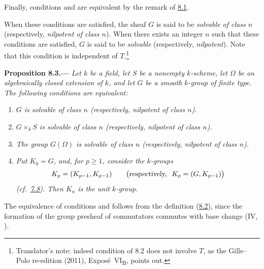 Finally, conditions \textup{} and \textup{} are
equivalent by the remark of \hyperref[par:sga3-VIB-8.1]{8.1}.

When these conditions are satisfied, the sheaf \(G\) is said
to be \emph{solvable of class \(n\)}
\textup{(}respectively, \emph{nilpotent of class \(n\)}\textup{)}.
When there exists an integer \(n\) such that these conditions are
satisfied, \(G\) is said to be \emph{solvable}
\textup{(}respectively, \emph{nilpotent}\textup{)}. Note that this
condition is independent of \(T\).\footnote{Translator's note: indeed condition
\textup{} of 8.2 does not involve \(T\), as the Gille--Polo re-edition (2011),
Exposé~VI\textsubscript{B}, points out.}

\medskip
{}\label{prop:sga3-VIB-8.3}%
\noindent\textbf{Proposition 8.3.---}
\emph{Let \(k\) be a field, let \(S\) be a nonempty
\(k\)-scheme, let \(\Omega\) be an algebraically closed
extension of \(k\), and let \(G\) be a smooth \(k\)-group of
finite type. The following conditions are equivalent:}
\begin{enumerate}
\item[\textup{\SGAInlineRefTarget{prop:sga3-VIB-8.3:item:i}(i)}]\label{concl:sga3-VIB-8.3-i}
  \emph{\(G\) is solvable of class \(n\)
  \textup{(respectively, nilpotent of class \(n\))}.}

\item[\textup{(ii)}]\label{concl:sga3-VIB-8.3-ii}
  \emph{\(G\times_kS\) is solvable of class \(n\)
  \textup{(respectively, nilpotent of class \(n\))}.}

\item[\textup{(iii)}]\label{concl:sga3-VIB-8.3-iii}
  \emph{The group \(G(\Omega)\) is solvable of class \(n\)
  \textup{(respectively, nilpotent of class \(n\))}.}

\item[\textup{(iv)}]\label{concl:sga3-VIB-8.3-iv}
  \emph{Put \(K_0=G\), and, for \(p\geq1\), consider the
  \(k\)-groups}
  \[
    K_p=(K_{p-1},K_{p-1})
    \qquad
    \bigl(\textup{respectively, }\ K_p=(G,K_{p-1})\bigr)
  \]
  \emph{\textup{(cf.\ \hyperref[prop:sga3-VIB-7.8]{7.8})}.
  Then \(K_n\) is the unit \(k\)-group.}
\end{enumerate}

The equivalence of conditions \textup{} and \textup{}
follows from the definition
\textup{(}\hyperref[prop:sga3-VIB-8.2]{8.2}\textup{)}, since the
formation of the group presheaf of commutators commutes with
base change (IV, ).

